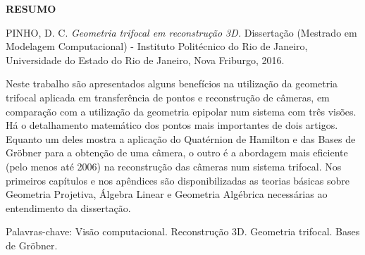 \begin{center}
{\bf RESUMO}
\end{center}

\vspace{1 cm}

\begin{center}
\begin{minipage}{1\textwidth}
\noindent PINHO, D. C. {\it Geometria trifocal em reconstrução 3D.} Dissertação (Mestrado em Modelagem Computacional) - Instituto Politécnico do Rio de Janeiro, Universidade do Estado do Rio de Janeiro, Nova Friburgo, 2016.
\end{minipage}
\end{center}

\vspace{1 cm}

\begin{center}
\begin{minipage}{1\textwidth}
\qquad Neste trabalho são apresentados alguns benefícios na utilização da geometria trifocal aplicada em transferência de pontos e reconstrução de câmeras, em comparação com a utilização da geometria epipolar num sistema com três visões. Há o detalhamento matemático dos pontos mais importantes de dois artigos. Equanto um deles mostra a aplicação do Quatérnion de Hamilton e das Bases de Gr\"obner para a obtenção de uma câmera, o outro é a abordagem mais eficiente (pelo menos até 2006) na reconstrução das câmeras num sistema trifocal. Nos primeiros capítulos e nos apêndices são disponibilizadas as teorias básicas sobre Geometria Projetiva, Álgebra Linear e Geometria Algébrica necessárias ao entendimento da dissertação.
\end{minipage}
\end{center}
 
\vspace{1 cm}

\begin{flushleft}
Palavras-chave: Visão computacional. Reconstrução 3D. Geometria trifocal. Bases de Gr\"obner. 
\end{flushleft}

\newpage